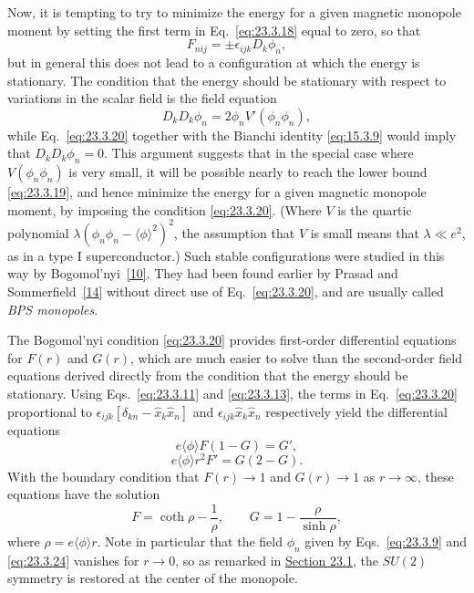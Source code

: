 Now, it is tempting to try to minimize the energy for a given magnetic
monopole moment by setting the first term in Eq.~\eqref{eq:23.3.18} equal
to zero, so that
\begin{equation}
 F_{nij}=\pm\epsilon_{ijk}D_k\phi_n,
 \tag{23.3.20}\label{eq:23.3.20}
\end{equation}
but in general this does not lead to a configuration at which the energy
is stationary. The condition that the energy should be stationary with
respect to variations in the scalar field is the field equation
\begin{equation}
 D_kD_k\phi_n=2\phi_nV'(\phi_n\phi_n),
 \tag{23.3.21}\label{eq:23.3.21}
\end{equation}
while Eq.~\eqref{eq:23.3.20} together with the Bianchi identity
\eqref{eq:15.3.9} would imply that $D_kD_k\phi_n=0$. This argument
suggests that in the special case where $V(\phi_n\phi_n)$ is very small,
it will be possible nearly to reach the lower bound \eqref{eq:23.3.19},
and hence minimize the energy for a given magnetic monopole moment, by
imposing the condition \eqref{eq:23.3.20}. (Where $V$ is the quartic
polynomial $\lambda(\phi_n\phi_n-\langle\phi\rangle^2)^2$, the assumption
that $V$ is small means that $\lambda\ll e^2$, as in a type I
superconductor.) Such stable configurations were studied in this way by
Bogomol'nyi~\hyperref[ch23-ref-10]{[10]}. They had been found earlier by
Prasad and Sommerfield~\hyperref[ch23-ref-14]{[14]} without direct use of
Eq.~\eqref{eq:23.3.20}, and are usually called \emph{BPS monopoles}.

The Bogomol'nyi condition \eqref{eq:23.3.20} provides first-order
differential equations for $F(r)$ and $G(r)$, which are much easier to
solve than the second-order field equations derived directly from the
condition that the energy should be stationary. Using
Eqs.~\eqref{eq:23.3.11} and \eqref{eq:23.3.13}, the terms in
Eq.~\eqref{eq:23.3.20} proportional to
$\epsilon_{ijk}[\delta_{kn}-\hat x_k\hat x_n]$ and
$\epsilon_{ijk}\hat x_k\hat x_n$ respectively yield the differential
equations
\begin{equation}
 e\langle\phi\rangle F(1-G)=G',
 \tag{23.3.22}\label{eq:23.3.22}
\end{equation}
\begin{equation}
 e\langle\phi\rangle r^2F'=G(2-G).
 \tag{23.3.23}\label{eq:23.3.23}
\end{equation}
With the boundary condition that $F(r)\to1$ and $G(r)\to1$ as
$r\to\infty$, these equations have the solution
\begin{equation}
 F=\coth\rho-\frac1\rho,\qquad
 G=1-\frac{\rho}{\sinh\rho},
 \tag{23.3.24}\label{eq:23.3.24}
\end{equation}
where $\rho=e\langle\phi\rangle r$. Note in particular that the field
$\phi_n$ given by Eqs.~\eqref{eq:23.3.9} and \eqref{eq:23.3.24} vanishes
for $r\to0$, so as remarked in \hyperref[sec:23.1]{Section 23.1}, the
$SU(2)$ symmetry is restored at the center of the monopole.

